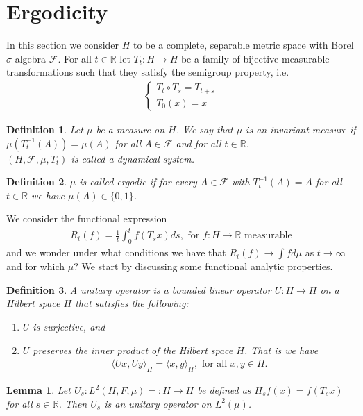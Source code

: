 \documentclass[11pt,a4paper, final]{article}
\newtheorem{lem}{Lemma}[section]
\newtheorem{defn}{Definition}[section]
\theoremstyle{definition}
\begin{document}
\section{Ergodicity}
In this section we consider $H$ to be a complete, separable metric space with Borel $\sigma$-algebra $\mathcal{F}$. For all $t \in \mathbb{R}$ let $T_t : H \to H$ be a family of bijective measurable transformations such that they satisfy the semigroup property, i.e.
\begin{align*}
\begin{cases} T_t \circ T_s = T_{t+s} \\ T_0(x) = x \end{cases}
\end{align*}
\begin{defn} Let $\mu$ be a measure on $H$. We say that $\mu$ is an invariant measure if $\mu (T_t^{-1}(A))= \mu (A)$ for all $A \in \mathcal{F}$ and for all $t \in \mathbb{R}$. \\  $(H, \mathcal{F},  \mu , T_t) $ is called a dynamical system. 
\end{defn}
\begin{defn} $\mu$ is called ergodic if for every $A \in \mathcal{F}$ with $T_t^{-1}(A)=A$ for all $t \in \mathbb{R}$ we have  $\mu(A) \in \lbrace 0 ,1 \rbrace $. 
\end{defn}
\noindent We consider the functional expression
\begin{align*}
R_t(f) = \frac{1}{t} \int_0^t f(T_sx)ds, \text{ for } f : H \to \mathbb{R} \text{ measurable}
\end{align*}
and we wonder under what conditions we have that $R_t(f) \to \int f d \mu$ as $t \to \infty$ and for which $\mu$? We start by discussing some functional analytic properties.
\begin{defn} A unitary operator is a bounded linear operator $U: H \to H$ on a Hilbert space $H$ that satisfies the following:
\begin{enumerate}
\item $U$ is surjective, and 
\item $U$ preserves the inner product of the Hilbert space $H$. That is we have 
\begin{align*}
\langle Ux, Uy \rangle_H = \langle x, y \rangle_H, \text{ for all } x,y \in H. 
\end{align*}
\end{enumerate}
\end{defn}
\begin{lem} Let $U_s : L^2(H, F, \mu)=:H \to H$ be defined as $H_sf(x)=f(T_sx)$ for all $s \in \mathbb{R}$. Then $U_s$ is an unitary operator on $L^2( \mu)$.
\end{lem}
\end{document}
